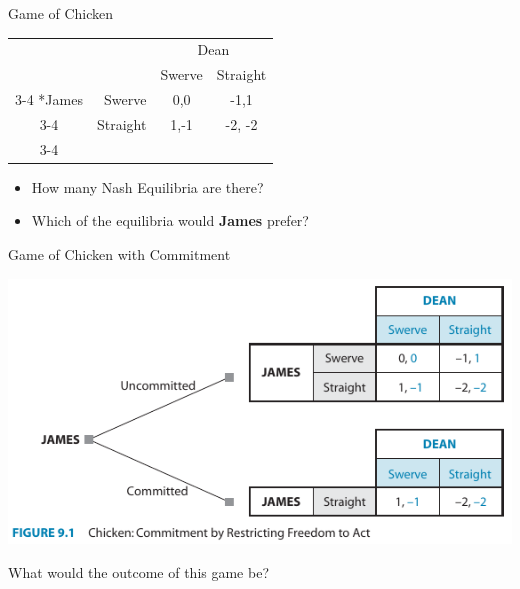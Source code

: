 
\begin{frame}{Game of Chicken}
  \begin{table}[!h]
		\centering
		\begin{tabular}{cr|c|c|}
			& \multicolumn{1}{c}{} & \multicolumn{2}{c}{Dean}\\
			& \multicolumn{1}{c}{} & \multicolumn{1}{c}{Swerve} & \multicolumn{1}{c}{Straight} \\\cline{3-4}
			\multirow{2}*{James} & Swerve & 0,0 & -1,1 \\\cline{3-4}
			& Straight & 1,-1 & -2, -2 \\\cline{3-4}
		\end{tabular}
	\end{table}
  \begin{itemize}
    \item How many Nash Equilibria are there? 
    \item Which of the equilibria would \textbf{James} prefer?
  \end{itemize}
\end{frame}


\begin{frame}{Game of Chicken with Commitment}
  \begin{center}
    \includegraphics[width=.9\textwidth]{figures/fig91.png} 
  \end{center} 
  What would the outcome of this game be?
\end{frame}


